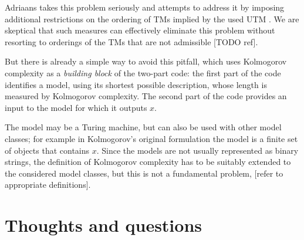 \documentclass{article}
\begin{document}
Adriaans takes this problem seriously and attempts to address it by imposing additional restrictions on the ordering of TMs implied by the used UTM \cite{TODO}. We are skeptical that such measures can effectively eliminate this problem without resorting to orderings of the TMs that are not admissible [TODO ref].

But there is already a simple way to avoid this pitfall, which uses Kolmogorov complexity as a \emph{building block} of the two-part code: the first part of the code identifies a model, using its shortest possible description, whose length is measured by Kolmogorov complexity. The second part of the code provides an input to the model for which it outputs $x$.

The model may be a Turing machine, but can also be used with other model classes; for example in Kolmogorov's original formulation the model is a finite set of objects that contains $x$. Since the models are not usually represented as binary strings, the definition of Kolmogorov complexity has to be suitably extended to the considered model classes, but this is not a fundamental problem, [refer to appropriate definitions].






\section{Thoughts and questions}
\end{document}
